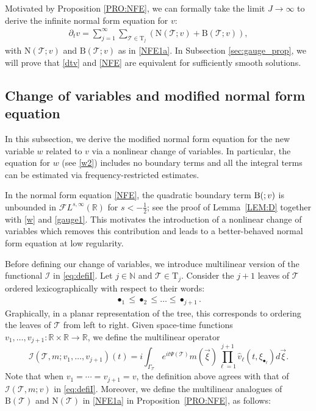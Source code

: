 \documentclass[%
11pt,  reqno]{amsart}
\makeatletter
\newcommand{\5}{\textup{V}}
\newcommand{\FL}{\mathcal{F} L}
\newcommand{\ft}{\widehat}
\newcommand{\dt}{\partial_t}
\theoremstyle{remark}
\newcommand{\R}{\mathbb{R}}
\newcommand{\bul}{\bullet}
\newcommand{\TT}{\mathcal{T}}
\newcommand{\Tr}{\mathrm{T}}
\renewcommand{\l}{\ell}
\newcommand{\N}{\mathbb{N}}
\def\<#1>{\csname MH@symb@#1\endcsname}
\newcommand{\B}{\mathcal{B}}
\newcommand{\Ical}{\mathcal{I}}
\numberwithin{equation}{section}
\numberwithin{theorem}{section}
\newcommand{\NN}{\mathrm{N}}
\newcommand{\BB}{\mathrm{B}}
\makeatother
\begin{document}
Motivated by Proposition \ref{PRO:NFE}, we can formally take the limit $J\to \infty$ to derive the infinite normal form equation for $v$:
\begin{align}
\label{NFE}
\dt v= \sum_{j=1}^{\infty} \sum_{\TT\in \Tr_j} \left(\NN(\TT;v) +
\BB(\TT;v) \right)
,
\end{align}
with $\NN(\TT;v)$ and $\BB(\TT;v)$ as in \eqref{NFE1a}. 
In Subsection \ref{sec:gauge_prop}, we will prove that \eqref{dtv} and \eqref{NFE} are equivalent for sufficiently smooth solutions.

\subsection{Change of variables and modified normal form equation}
\label{SUBSEC:gauge}

In this subsection, we derive the modified normal form equation for the new variable $w$ related to $v$ via a nonlinear change of variables. In particular, the equation for $w$ (see \eqref{w2}) includes no boundary terms and all the integral terms can be estimated via frequency-restricted estimates.



In the normal form equation \eqref{NFE}, the quadratic boundary term $\BB(\<1>;v)$ is unbounded in $\FL^{s,\infty}(\R)$ for $s<-\frac12$; see the proof of Lemma~\ref{LEM:D} together with \eqref{w} and \eqref{gauge1}. This motivates the introduction of a nonlinear change of variables which removes this contribution and leads to a better-behaved normal form equation at low regularity.

Before defining our change of variables, we introduce multilinear version of the functional $\Ical$ in \eqref{eq:defiI}.
Let $j\in \N$ and $\TT\in \Tr_j$. Consider the $j+1$ leaves of $\TT$ ordered lexicographically with respect to their words:
\begin{align}
\label{lexic}
\bul_1\le \bul_2\le \dots \le \bul_{j+1}.
\end{align}
Graphically, in a
planar representation of the tree, this corresponds to ordering the leaves of
$\TT$ from left to right. Given space-time functions $v_1,\dots, v_{j+1}: \R \times \R \to \R$, we
define the multilinear operator
\begin{equation}\label{eq:defiImulti}
\Ical(\TT, m; v_1,\dots,v_{j+1}) (t)=i
\int_{\Gamma_\TT}
e^{it\Psi(\TT)}m(\vec{\xi}) \prod_{\ell
=1}^{j+1} \ft v_\l (t,\xi_{\bul_\ell}) d\vec{\xi}
.
\end{equation}
Note that
when $v_1 = \cdots = v_{j+1} = v$, the definition above agrees with that of $\Ical(\TT, m; v )$ in \eqref{eq:defiI}.  Moreover, we define the multilinear analogues of $\BB(\TT)$ and $\NN(\TT)$ in \eqref{NFE1a} in Proposition~\ref{PRO:NFE}, as follows:
\end{document}
